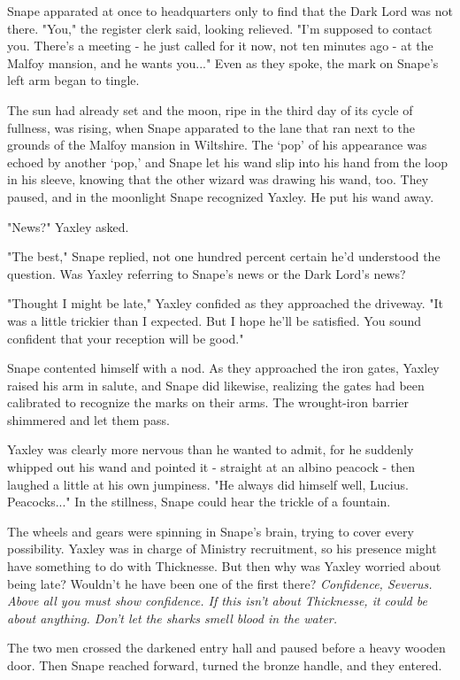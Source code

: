 Snape apparated at once to headquarters only to find that the Dark Lord was not there. "You," the register clerk said, looking relieved. "I'm supposed to contact you. There's a meeting - he just called for it now, not ten minutes ago - at the Malfoy mansion, and he wants you..." Even as they spoke, the mark on Snape's left arm began to tingle.

The sun had already set and the moon, ripe in the third day of its cycle of fullness, was rising, when Snape apparated to the lane that ran next to the grounds of the Malfoy mansion in Wiltshire. The `pop' of his appearance was echoed by another `pop,' and Snape let his wand slip into his hand from the loop in his sleeve, knowing that the other wizard was drawing his wand, too. They paused, and in the moonlight Snape recognized Yaxley. He put his wand away.

"News?" Yaxley asked.

"The best," Snape replied, not one hundred percent certain he'd understood the question. Was Yaxley referring to Snape's news or the Dark Lord's news?

"Thought I might be late," Yaxley confided as they approached the driveway. "It was a little trickier than I expected. But I hope he'll be satisfied. You sound confident that your reception will be good."

Snape contented himself with a nod. As they approached the iron gates, Yaxley raised his arm in salute, and Snape did likewise, realizing the gates had been calibrated to recognize the marks on their arms. The wrought-iron barrier shimmered and let them pass.

Yaxley was clearly more nervous than he wanted to admit, for he suddenly whipped out his wand and pointed it - straight at an albino peacock - then laughed a little at his own jumpiness. "He always did himself well, Lucius. Peacocks..." In the stillness, Snape could hear the trickle of a fountain.

The wheels and gears were spinning in Snape's brain, trying to cover every possibility. Yaxley was in charge of Ministry recruitment, so his presence might have something to do with Thicknesse. But then why was Yaxley worried about being late? Wouldn't he have been one of the first there? \emph{Confidence, Severus. Above all you must show confidence. If this isn't about Thicknesse, it could be about anything. Don't let the sharks smell blood in the water.}

The two men crossed the darkened entry hall and paused before a heavy wooden door. Then Snape reached forward, turned the bronze handle, and they entered.

